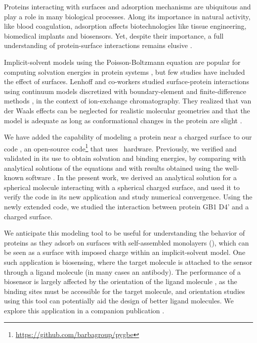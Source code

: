 
Proteins interacting with surfaces and adsorption mechanisms are ubiquitous and play a role in many biological processes. 
Along its importance in natural activity, like blood coagulation, adsorption affects biotechnologies like tissue engineering, biomedical implants and biosensors.
Yet, despite their importance, a full understanding of protein-surface interactions remains elusive \cite{Gray2004,RabeVerdesSeegel2011}.

Implicit-solvent models using the Poisson-Boltzmann equation are popular for computing solvation energies in protein systems \cite{RouxSimonson1999,Bardhan2012}, but few studies have included the effect of surfaces. Lenhoff and co-workers studied surface-protein interactions using continuum models discretized with boundary-element \cite{YoonLenhoff1992,RothLenhoff1993,AsthagiriLenhoff1997} and finite-difference methods \cite{YaoLenhoff2004,YaoLenhoff2005}, in the context of ion-exchange chromatography. They realized that van der Waals effects can be neglected for realistic molecular geometries \cite{RothNealLenhoff1996} and that the model is adequate as long as conformational changes in the protein are slight \cite{YaoLenhoff2004,YaoLenhoff2005}. 

We have added the capability of modeling a protein near a charged surface to our code \pygbe, an open-source code\footnote{\url{https://github.com/barbagroup/pygbe}}  that uses \gpu\ hardware.  Previously, we verified and validated \pygbe in its use to obtain solvation and binding energies, by comparing with analytical solutions of the equations and with results obtained using the well-known \apbs software \cite{CooperBarba-share154331,CooperBardhanBarba2013} . 
In the present work, we derived an analytical solution for a spherical molecule interacting with a spherical charged surface, and used it to verify the code in its new application and study numerical convergence.
Using the newly extended code, we studied the interaction between protein GB1 D4' and a charged surface.

We anticipate this modeling tool to be useful for understanding the behavior of proteins as they adsorb on surfaces with self-assembled monolayers (\sam), which can be seen as a surface with imposed charge within an implicit-solvent model. 
One such application is biosensing, where the target molecule is attached to the sensor through a ligand molecule (in many cases an antibody). The performance of a biosensor is largely affected by the orientation of the ligand molecule \cite{TajimaTakaiIshihara2011,TrillingBeekwilderZuilhof2013}, as the binding sites must be accessible for the target molecule, and orientation studies using this tool can potentially aid the design of better ligand molecules. We explore this application in a companion publication \cite{CooperBarba2015b}.
